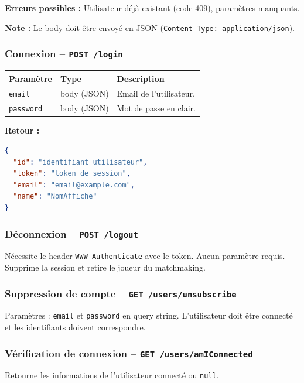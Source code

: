 \documentclass[12pt,a4paper]{article}
\begin{document}
\textbf{Erreurs possibles :} Utilisateur déjà existant (code 409), paramètres manquants.

\textbf{Note :} Le body doit être envoyé en JSON (\texttt{Content-Type: application/json}).

\subsubsection{Connexion -- \texttt{POST /login}}

\begin{tabularx}{\textwidth}{l l X}
\toprule
\textbf{Paramètre} & \textbf{Type} & \textbf{Description} \\
\midrule
\texttt{email} & body (JSON) & Email de l'utilisateur. \\
\texttt{password} & body (JSON) & Mot de passe en clair. \\
\bottomrule
\end{tabularx}

\vspace{0.2cm}
\textbf{Retour :}
\begin{lstlisting}[language=json]
{
  "id": "identifiant_utilisateur",
  "token": "token_de_session",
  "email": "email@example.com",
  "name": "NomAffiche"
}
\end{lstlisting}

\subsubsection{Déconnexion -- \texttt{POST /logout}}

Nécessite le header \texttt{WWW-Authenticate} avec le token. Aucun paramètre requis. Supprime la session et retire le joueur du matchmaking.

\subsubsection{Suppression de compte -- \texttt{GET /users/unsubscribe}}

Paramètres : \texttt{email} et \texttt{password} en query string. L'utilisateur doit être connecté et les identifiants doivent correspondre.

\subsubsection{Vérification de connexion -- \texttt{GET /users/amIConnected}}

Retourne les informations de l'utilisateur connecté ou \texttt{null}.
\end{document}
